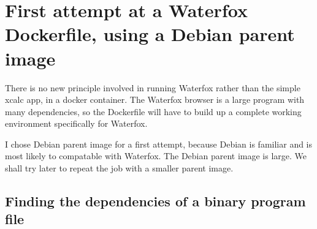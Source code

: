 \documentclass{article}  %
\begin{document}
\section{First attempt at a Waterfox Dockerfile, using a  Debian parent image}
There is no new principle involved in running Waterfox rather than the simple xcalc app, in a docker container. The Waterfox browser is a large program with many dependencies, so the Dockerfile will have to build up a complete working environment specifically for Waterfox. 

I chose Debian parent image for a first attempt, because Debian is familiar and is most likely to compatable with Waterfox.  The Debian parent image is large. We shall try later to repeat the job with a smaller parent image. 

\subsection{Finding the dependencies of a binary program file}
\end{document}
